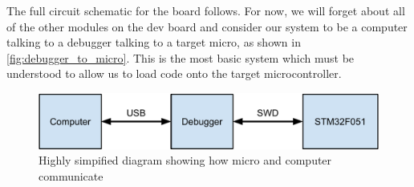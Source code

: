 The full circuit schematic for the board follows. 
For now, we will forget about all of the other modules on the dev board and consider our system to be a computer talking to a debugger talking to a target micro, as shown in \autoref{fig:debugger_to_micro}. 
This is the most basic system which must be understood to allow us to load code onto the target microcontroller.

\begin{figure}[t]
  \includegraphics[width=\textwidth]{./week1/debugger_to_micro.pdf}
  \caption{Highly simpified diagram showing how micro and computer communicate}
  \label{fig:debugger_to_micro}
\end{figure}

\afterpage{
  \begin{landscape}
    \centering
    
 \end{landscape}
} 









